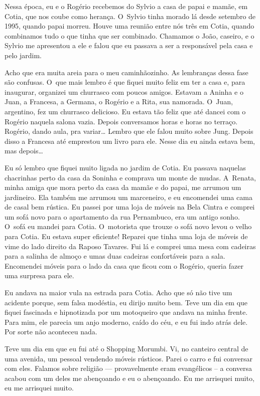 Nessa época, eu e o Rogério recebemos do Sylvio a casa de papai e mamãe,
em Cotia, que nos coube como herança. O~Sylvio tinha morado lá desde
setembro de 1995, quando papai morreu. Houve uma reunião entre nós três
em Cotia, quando combinamos tudo o que tinha que ser combinado. Chamamos
o João, caseiro, e o Sylvio me apresentou a ele e falou que eu passava a
ser a responsável pela casa e pelo jardim.

Acho que era muita areia para o meu caminhãozinho. As lembranças dessa
fase são confusas. O~que mais lembro é que fiquei muito feliz em ter a
casa e, para inaugurar, organizei um churrasco com poucos amigos.
Estavam a Aninha e o Juan, a Francesa, a Germana, o Rogério e a Rita,
sua namorada. O~Juan, argentino, fez um churrasco delicioso. Eu estava
tão feliz que até dancei com o Rogério naquela salona vazia. Depois
conversamos horas e horas no terraço. Rogério, dando aula, pra
variar… Lembro que ele falou muito sobre Jung. Depois disso a
Francesa até emprestou um livro para ele. Nesse dia eu ainda estava
bem, mas depois…

Eu só lembro que fiquei muito ligada no jardim de Cotia. Eu passava
naquelas chacrinhas perto da casa da Soninha e comprava um monte de
mudas. A~Renata, minha amiga que mora perto da casa da mamãe e do papai,
me arrumou um jardineiro. Ela também me arrumou um marceneiro, e eu
encomendei uma cama de casal bem rústica. Eu passei por uma loja de
móveis na Bela Cintra e comprei um sofá novo para o apartamento da rua
Pernambuco, era um antigo sonho. O~sofá eu mandei para Cotia. O~motorista que trouxe o sofá novo levou o velho para Cotia. Eu estava
super eficiente! Reparei que tinha uma loja de móveis de vime do
lado direito da Raposo Tavares. Fui lá e comprei uma mesa com cadeiras
para a salinha de almoço e umas duas cadeiras confortáveis para a sala.
Encomendei móveis para o lado da casa que ficou com o Rogério, queria
fazer uma surpresa para ele.

Eu andava na maior vula na estrada para Cotia. Acho que só não tive um
acidente porque, sem falsa modéstia, eu dirijo muito bem. Teve um dia em
que fiquei fascinada e hipnotizada por um motoqueiro que andava na minha
frente. Para mim, ele parecia um anjo moderno, caído do céu, e eu fui
indo atrás dele. Por sorte não aconteceu nada.

Teve um dia em que eu fui até o Shopping Morumbi. Vi, no canteiro
central de uma avenida, um pessoal vendendo móveis rústicos. Parei o
carro e fui conversar com eles. Falamos sobre religião --- provavelmente
eram evangélicos -- a conversa acabou com um deles me abençoando e eu o
abençoando. Eu me arrisquei muito, eu me arrisquei muito.

